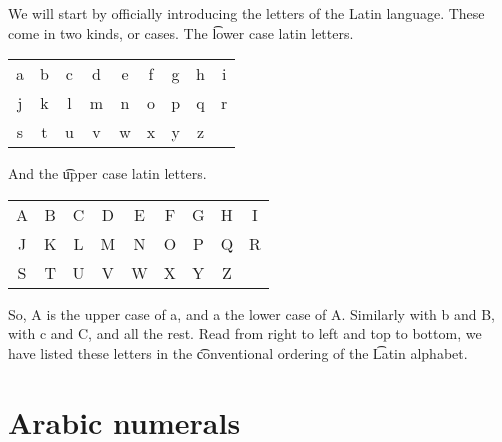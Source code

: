 We will start by officially introducing the letters of the Latin language.
These come in two kinds, or cases.
The \t{lower case latin letters}.
\begin{center}
\vspace{0.3cm}
\begin{tabular}{ccccccccc}
a & b & c & d & e & f & g & h & i\\
j & k & l & m & n & o & p & q & r\\
s & t & u & v & w & x & y & z & \\
\end{tabular}
\vspace{0.1cm}

%   
\end{center}
And the \t{upper case latin letters}.
\begin{center}
\vspace{0.3cm}
\begin{tabular}{ccccccccc}
A & B & C & D & E & F & G & H & I\\
J & K & L & M & N & O & P & Q & R\\
S & T & U & V & W & X & Y & Z & \\
\end{tabular}
\vspace{0.1cm}

\end{center}
So, A is the upper case of a, and a the lower case of A.
Similarly with b and B, with c and C, and all the rest.
Read from right to left and top to bottom, we have listed these letters in the \t{conventional ordering} of the \t{Latin alphabet}.

\section*{Arabic numerals}

